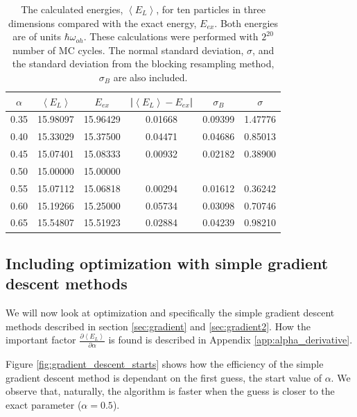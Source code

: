 \begin{table}[H]\caption{The calculated energies, $\left<E_L\right>$, for ten particles in three dimensions compared with the exact energy, $E_{ex}$. Both energies are of units $\hbar\omega_{oh}$. These calculations were performed with $2^{20}$ number of MC cycles. The normal standard deviation, $\sigma$, and the standard deviation from the blocking resampling method, $\sigma_B$ are also included.}\label{tab:importance_N_10}
\center
\begin{tabular}{cccccc}
$\alpha$ & $\left< E_L \right>$ & $E_{ex}$ & |$\left< E_L \right>-E_{ex}$|  & $\sigma_B$ & $\sigma$\\ \hline
0.35 & 15.98097 & 15.96429 & 0.01668 & 0.09399 & 1.47776\\
0.40 & 15.33029 & 15.37500 & 0.04471 & 0.04686 & 0.85013\\
0.45 & 15.07401 & 15.08333 & 0.00932 & 0.02182 & 0.38900\\
0.50 & 15.00000 & 15.00000 &                &                &                \\
0.55 & 15.07112 & 15.06818 & 0.00294 & 0.01612 & 0.36242\\
0.60 & 15.19266 & 15.25000 & 0.05734 & 0.03098 & 0.70746\\
0.65 & 15.54807 & 15.51923 & 0.02884 & 0.04239 & 0.98210\\
\end{tabular}
\end{table} 

\subsection{Including optimization with simple  gradient descent methods}

We will now look at optimization and specifically the simple gradient descent methods described in section \ref{sec:gradient} and \ref{sec:gradient2}. How the important factor $\frac{\partial \left< E_L\right>}{\partial \alpha}$ is found is described in Appendix \ref{app:alpha_derivative}.

Figure \ref{fig:gradient_descent_starts} shows how the efficiency of the simple gradient descent method is dependant on the first guess, the start value of $\alpha$. We observe that, naturally, the algorithm is faster when the guess is closer to the exact parameter ($\alpha = 0.5$). 

